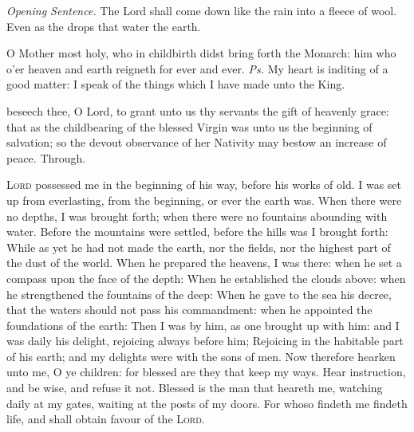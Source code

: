 \par\noindent
\textit{Opening Sentence.} The Lord shall come down like the rain into a fleece of wool. Even as the drops that water the earth.

\vspace{-0.4\baselineskip}

\introit

\vspace{-0.2\baselineskip}

 O Mother most holy, who in childbirth didst bring forth the Monarch: him who o'er heaven and earth reigneth for ever and ever. \textit{Ps.} My heart is inditing of a good matter: I speak of the things which I have made unto the King.

\vspace{-0.4\baselineskip}

\collect

\vspace{-0.2\baselineskip}

 beseech thee, O Lord, to grant unto us thy servants the gift of heavenly grace: that as the childbearing of the blessed Virgin was unto us the beginning of salvation; so the devout observance of her Nativity may bestow an increase of peace. Through.

 \textsc{Lord} possessed me in the beginning of his way, before his works of old. I was set up from everlasting, from the beginning, or ever the earth was. When there were no depths, I was brought forth; when there were no fountains abounding with water. Before the mountains were settled, before the hills was I brought forth: While as yet he had not made the earth, nor the fields, nor the highest part of the dust of the world. When he prepared the heavens, I was there: when he set a compass upon the face of the depth: When he established the clouds above: when he strengthened the fountains of the deep: When he gave to the sea his decree, that the waters should not pass his commandment: when he appointed the foundations of the earth: Then I was by him, as one brought up with him: and I was daily his delight, rejoicing always before him; Rejoicing in the habitable part of his earth; and my delights were with the sons of men. Now therefore hearken unto me, O ye children: for blessed are they that keep my ways. Hear instruction, and be wise, and refuse it not. Blessed is the man that heareth me, watching daily at my gates, waiting at the posts of my doors. For whoso findeth me findeth life, and shall obtain favour of the \textsc{Lord}.

